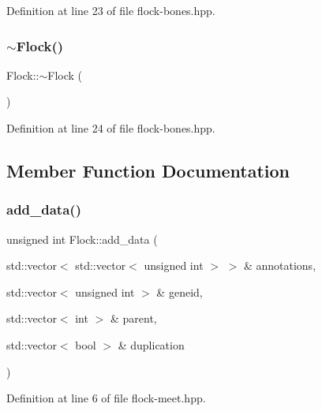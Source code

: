 Definition at line 23 of file flock-\/bones.\+hpp.

\mbox{\label{class_flock_ab5ed0567a8721dd114763267f9fa3bdf}} 
\subsubsection{\texorpdfstring{$\sim$\+Flock()}{~Flock()}}
{\footnotesize\ttfamily Flock\+::$\sim$\+Flock (\begin{DoxyParamCaption}{ }\end{DoxyParamCaption})\hspace{0.3cm}{\ttfamily [inline]}}



Definition at line 24 of file flock-\/bones.\+hpp.



\subsection{Member Function Documentation}
\mbox{\label{class_flock_a17f2726d36ca5727b14c71d1e1dbabe9}} 
\subsubsection{\texorpdfstring{add\+\_\+data()}{add\_data()}}
{\footnotesize\ttfamily unsigned int Flock\+::add\+\_\+data (\begin{DoxyParamCaption}\item[{std\+::vector$<$ std\+::vector$<$ unsigned int $>$ $>$ \&}]{annotations,  }\item[{std\+::vector$<$ unsigned int $>$ \&}]{geneid,  }\item[{std\+::vector$<$ int $>$ \&}]{parent,  }\item[{std\+::vector$<$ bool $>$ \&}]{duplication }\end{DoxyParamCaption})\hspace{0.3cm}{\ttfamily [inline]}}



Definition at line 6 of file flock-\/meet.\+hpp.

\mbox{\label{class_flock_a1e7aec0dc05f41da6f0caa80a202daa0}} 
